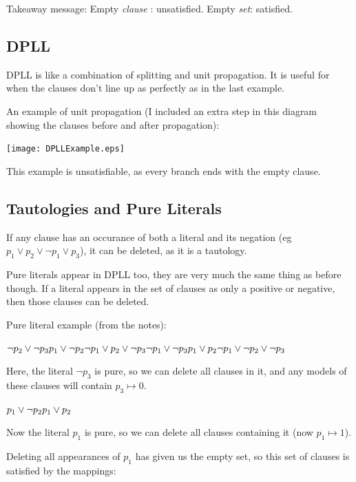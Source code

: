 \documentclass[11pt,a4paper]{article}
\begin{document}
Takeaway message: Empty \emph{clause} : unsatisfied. Empty \emph{set}: satisfied.

\subsection{DPLL}

DPLL is like a combination of splitting and unit propagation. It is useful for when the clauses don't line up as perfectly as in the last example.

An example of unit propagation (I included an extra step in this diagram showing the clauses before and after propagation):

\centerline{\texttt{[image: DPLLExample.eps]}}

This example is unsatisfiable, as every branch ends with the empty clause.

\subsection{Tautologies and Pure Literals}

If any clause has an occurance of both a literal and its negation (eg $p_1 \vee p_2 \vee \neg p_1 \vee p_3$), it can be deleted, as it is a tautology.

Pure literals appear in DPLL too, they are very much the same thing as before though. If a literal appears in the set of clauses as only a positive or negative, then those clauses can be deleted.

Pure literal example (from the notes):

$\neg p_2 \vee \neg p_3 \\ p_1 \vee \neg p_2 \\ \neg p_1 \vee p_2 \vee \neg p_3 \\ \neg p_1 \vee \neg p_3 \\ p_1 \vee p_2 \\ \neg p_1 \vee \neg p_2 \vee \neg p_3$

Here, the literal $\neg p_3$ is pure, so we can delete all clauses in it, and any models of these clauses will contain $p_3 \mapsto 0$.

$p_1 \vee \neg p_2 \\ p_1 \vee p_2$

Now the literal $p_1$ is pure, so we can delete all clauses containing it (now $p_1 \mapsto 1$).

Deleting all appearances of $p_1$ has given us the empty set, so this set of clauses is satisfied by the mappings:
\end{document}

